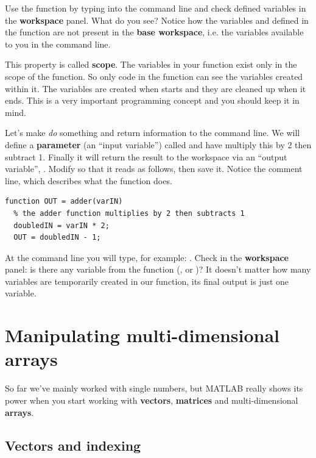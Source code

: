 \documentclass{article}
\begin{document}
Use the function by typing  into the command line and check defined variables in the \textbf{workspace} panel. What do you see?
Notice how the variables  and  defined in the  function are not present in the \textbf{base workspace}, i.e. the variables available to you in the command line.

This property is called \textbf{scope}.
The variables in your  function exist only in the scope of the  function. 
So only code in the  function can see the variables created within it.
The variables are created when  starts and they are cleaned up when it ends.
This is a very important programming concept and you should keep it in mind.

Let's make  \emph{do} something and return information to the command line.
We will define a \textbf{parameter} (an ``input variable'') called  and have  multiply this by 2 then subtract 1.
Finally it will return the result to the workspace via an ``output variable'', .
Modify  so that it reads as follows, then save it.
Notice the comment line, which describes what the function does. 
\begin{lstlisting}
function OUT = adder(varIN)
  % the adder function multiplies by 2 then subtracts 1
  doubledIN = varIN * 2;
  OUT = doubledIN - 1;
\end{lstlisting}

At the command line you will type, for example: .
Check in the \textbf{workspace} panel: is there any variable from the function (,  or )?
It doesn't matter how many variables are temporarily created in our function, its final output is just one variable.



\section{Manipulating multi-dimensional arrays}

So far we've mainly worked with single numbers, but MATLAB really shows its power when you start working with \textbf{vectors}, \textbf{matrices} and multi-dimensional \textbf{arrays}.

\subsection{Vectors and indexing}
\end{document}
